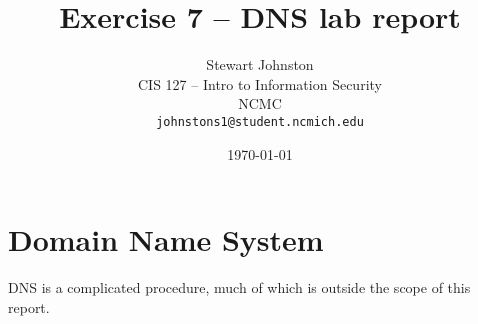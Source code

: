 \documentclass{article}
\title{Exercise 7 -- DNS lab report}
\author{Stewart Johnston\\
  {CIS 127 -- Intro to Information Security}\\
  {NCMC}\\
  {\texttt{johnstons1@student.ncmich.edu}}
}
\date{\today}
\begin{document}
\maketitle

\section{Domain Name System}
DNS is a complicated procedure, much of which is outside the scope of this
report. 
\end{document}
